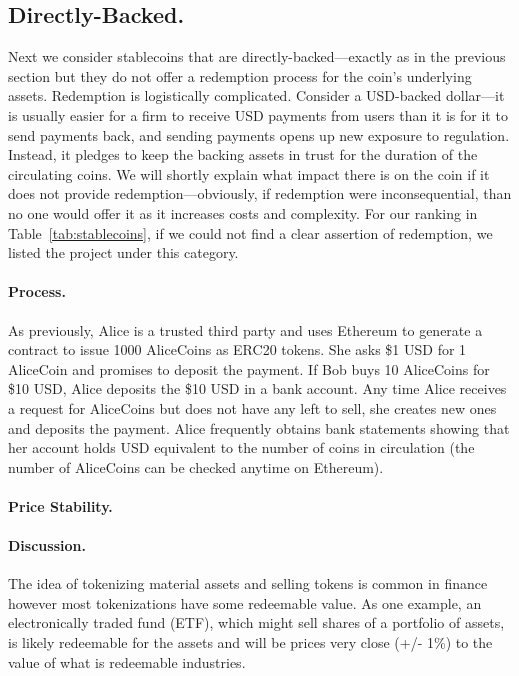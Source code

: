 \subsection{Directly-Backed.}

Next we consider stablecoins that are directly-backed---exactly as in the previous section but they do not offer a redemption process for the coin's underlying assets. Redemption is logistically complicated. Consider a USD-backed dollar---it is usually easier for a firm to receive USD payments from users than it is for it to send payments back, and sending payments opens up new exposure to regulation. Instead, it pledges to keep the backing assets in trust for the duration of the circulating coins. We will shortly explain what impact there is on the coin if it does not provide redemption---obviously, if redemption were inconsequential, than no one would offer it as it increases costs and complexity. For our ranking in Table~\ref{tab:stablecoins}, if we could not find a clear assertion of redemption, we listed the project under this category.

\paragraph{Process.} As previously, Alice is a trusted third party and uses Ethereum to generate a contract to issue 1000 AliceCoins as ERC20 tokens. She asks \$1 USD for 1 AliceCoin and promises to deposit the payment. If Bob buys 10 AliceCoins for \$10 USD, Alice deposits the \$10 USD in a bank account. Any time Alice receives a request for AliceCoins but does not have any left to sell, she creates new ones and deposits the payment. Alice frequently obtains bank statements showing that her account holds USD equivalent to the number of coins in circulation (the number of AliceCoins can be checked anytime on Ethereum).

\paragraph{Price Stability.} 

\paragraph{Discussion.} The idea of tokenizing material assets and selling tokens is common in finance however most tokenizations have some redeemable value. As one example, an electronically traded fund (ETF), which might sell shares of a portfolio of assets, is likely redeemable for the assets and will be prices very close (+/- 1\%) to the value of what is redeemable    industries. 


